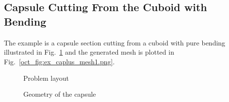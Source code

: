 \subsection{Capsule Cutting From the Cuboid with Bending}
\paragraph{}
The example is a capsule section cutting from a cuboid with pure bending illustrated in Fig.~\ref{oct_fig:ex_caplus_layout} and the generated mesh is plotted in Fig.~\ref{oct_fig:ex_caplus_mesh1.png}.
\begin{figure}[h!]
  \centering
  \caption{Problem layout}
  \label{oct_fig:ex_caplus_layout}
\end{figure}
%
\begin{figure}[h!]
  \centering
  \caption{Geometry of the capsule}
  \label{oct_fig:ex_caplus_geo}
\end{figure}
%
